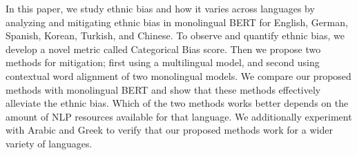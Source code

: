 In this paper, we study ethnic bias and how it varies across languages by analyzing and mitigating ethnic bias in monolingual BERT for English, German, Spanish, Korean, Turkish, and Chinese. To observe and quantify ethnic bias, we develop a novel metric called Categorical Bias score. Then we propose two methods for mitigation; first using a multilingual model, and second using contextual word alignment of two monolingual models. We compare our proposed methods with monolingual BERT and show that these methods effectively alleviate the ethnic bias. Which of the two methods works better depends on the amount of NLP resources available for that language. We additionally experiment with Arabic and Greek to verify that our proposed methods work for a wider variety of languages.
